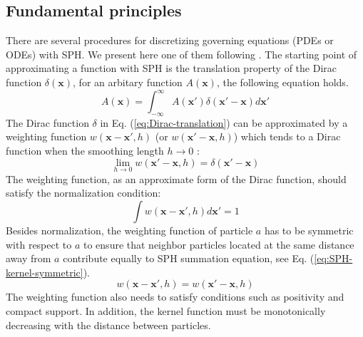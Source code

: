 \documentclass[gmd, manuscript]{copernicus}
\begin{document}
\subsection{Fundamental principles}
There are several procedures for discretizing governing equations (PDEs or ODEs) with SPH. We present here one of them following \citet{monaghan1992smoothed, monaghan2005smoothed, monaghan2012smoothed}. The starting point of approximating a function with SPH is the translation property of the Dirac function $\delta(\textbf{x})$, for an arbitary function $A(\textbf{x})$, the following equation holds. 
\begin{equation}
A\left(\textbf{x}\right)=\int_{-\infty}^{\infty} A\left(\textbf{x} \prime\right) \delta \left(\textbf{x} \prime - \textbf{x}\right) d\textbf{x} \prime
\label{eq:Dirac-translation}
\end{equation}
The Dirac function $\delta$ in Eq. (\ref{eq:Dirac-translation}) can be approximated by a weighting function $w\left(\textbf{x}-\textbf{x}\prime, h\right)$ (or $w\left(\textbf{x}\prime-\textbf{x}, h\right)$) which tends to a Dirac function when the smoothing length $h \rightarrow 0$ :
\begin{equation}
\lim _{h \rightarrow 0} w\left(\textbf{x} \prime-\textbf{x}, h\right) =  \delta \left(\textbf{x} \prime - \textbf{x}\right)
\label{eq:SPH_kernel_delta}
\end{equation}
The weighting function, as an approximate form of the Dirac function, should satisfy the normalization condition:
\begin{equation}
\int	 w\left(\textbf{x}-\textbf{x}\prime, h\right) d\textbf{x}\prime = 1
\label{eq:SPH-kernel-normalization-prop}
\end{equation}
Besides normalization, the weighting function of particle $a$ has to be symmetric with respect to $a$ to ensure that neighbor particles located at the same distance away from $a$ contribute equally to SPH summation equation, see Eq. (\ref{eq:SPH-kernel-symmetric}).
\begin{equation}
w\left(\textbf{x}- \textbf{x} \prime, h\right) = w\left(\textbf{x} \prime - \textbf{x}, h\right)
\label{eq:SPH-kernel-symmetric}
\end{equation}
The weighting function also needs to satisfy conditions such as positivity and compact support. In addition, the kernel function must be monotonically decreasing with the distance between particles.
\end{document}
